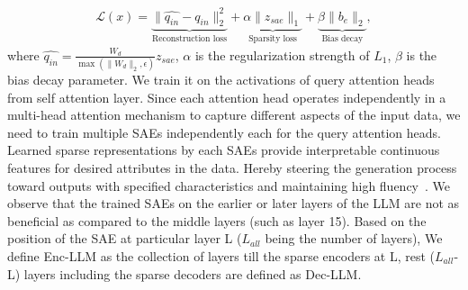 \begin{align}
\mathcal{L}(x) = \underbrace{\|\hat{q_{in}} - q_{in}\|_2^2}_{\text{Reconstruction loss}} + \underbrace{\alpha\|z_{sae}\|_1}_{\text{Sparsity loss}} + \underbrace{\beta\|b_e\|_2}_{\text{Bias decay}},
\end{align}
where $\hat{q_{in}} = \frac{W_d}{\max(\|W_d\|_2, \epsilon)}z_{sae}$,
 $\alpha$ is the regularization strength of $L_{1}$, $\beta$ is the bias decay parameter.
We train it on the activations of query attention heads from self attention layer. Since each attention head operates independently in a multi-head attention mechanism to capture different aspects of the input data, we need to train multiple SAEs independently each for the query attention heads. Learned sparse representations by each SAEs provide interpretable continuous features for desired attributes in the data. Hereby steering the generation process toward outputs with specified characteristics and maintaining high fluency~\cite{liang2024controllable}. We observe that the trained SAEs on the earlier or later layers of the LLM are not as beneficial as compared to the middle layers (such as layer 15). Based on the position of the SAE at particular layer L ($L_{all}$ being the number of layers), We define Enc-LLM as the collection of layers till the sparse encoders at L, rest ($L_{all}$-L) layers including the sparse decoders are defined as Dec-LLM. 



 














